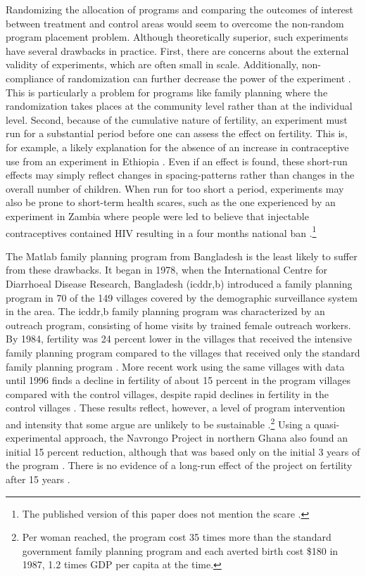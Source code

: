 Randomizing the allocation of programs and comparing the outcomes of interest between treatment and control areas would seem to overcome the non-random program placement problem. Although theoretically superior, such experiments have several drawbacks in practice. First, there are concerns about the external validity of experiments, which are often small in scale. Additionally, non-compliance of randomization can further decrease the power of the experiment \citep{Desai2011}. This is particularly a problem for programs like family planning where the randomization takes places at the community level rather than at the individual level. Second, because of the cumulative nature of fertility, an experiment must run for a substantial period before one can assess the effect on fertility. This is, for example, a likely explanation for the absence of an increase in contraceptive use from an experiment in Ethiopia \citep{Desai2011}. Even if an effect is found, these short-run effects may simply reflect changes in spacing-patterns rather than changes in the overall number of children. When run for too short a period, experiments may also be prone to short-term health scares, such as the one experienced by an experiment in Zambia where people were led to believe that injectable contraceptives contained HIV resulting in a four months national ban \citep{Ashraf2009}.\footnote{The published version of this paper does not mention the scare \citep{Ashraf2014}.}

The Matlab family planning program from Bangladesh is the least likely to suffer from these drawbacks. It began in 1978, when the International Centre for Diarrhoeal Disease Research, Bangladesh (icddr,b) introduced a family planning program in 70 of the 149 villages covered by the demographic surveillance system in the area. The icddr,b family planning program was characterized by an outreach program, consisting of home visits by trained female outreach workers. By 1984, fertility was 24 percent lower in the villages that received the intensive family planning program compared to the villages that received only the standard family planning program \citep{Phillips1988}. More recent work using the same villages with data until 1996 finds a decline in fertility of about 15 percent in the program villages compared with the control villages, despite rapid declines in fertility in the control villages \citep{Sinha2005,Joshi2007}. These results reflect, however, a level of program intervention and intensity that some argue are unlikely to be sustainable \citep{pritchett94a}.\footnote{Per woman reached, the program cost 35 times more than the standard government family planning program and each averted birth cost \$180 in 1987, 1.2 times GDP per capita at the time.} Using a quasi-experimental approach, the Navrongo Project in northern Ghana also found an initial 15 percent reduction, although that was based only on the initial 3 years of the program \citep{Debpuur2002}. There is no evidence of a long-run effect of the project on fertility after 15 years \citep{Phillips2012}.

